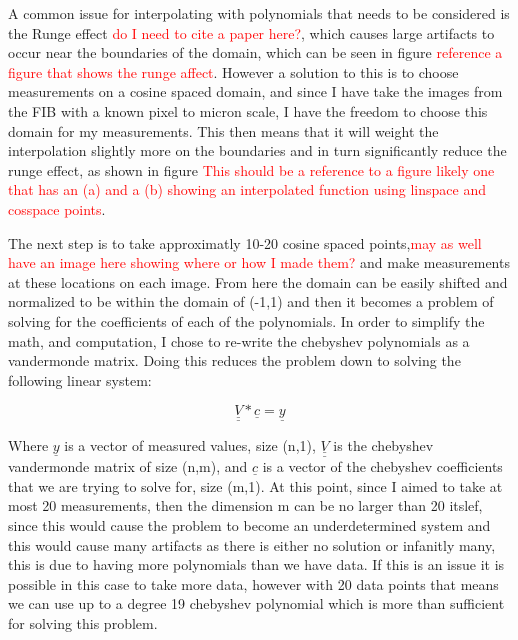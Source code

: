 \documentclass[review]{elsarticle}
\def\doubleunderline#1{\underline{\underline{#1}}}
\begin{document}
		A common issue for interpolating with polynomials that needs to be considered is the Runge effect \textcolor{red}{do I need to cite a paper here?}, which causes large artifacts to occur near the boundaries
		of the domain, which can be seen in figure \textcolor{red}{reference a figure that shows the runge affect}. However a solution to this is to choose measurements on a cosine spaced domain, and since I have 
		take the images from the FIB with a known pixel to micron scale, I have the freedom to choose this domain for my measurements. This then means that it will weight the interpolation slightly more on the boundaries
		and in turn significantly reduce the runge effect, as shown in figure \textcolor{red}{This should be a reference to a figure likely one that has an (a) and a (b) showing an interpolated function using linspace
		and cosspace points}.

		The next step is to take approximatly 10-20 cosine spaced points,\textcolor{red}{may as well have an image here showing where or how I made them?} and make measurements at these locations on each image. 
		From here the domain can be easily shifted and normalized to be within the domain of (-1,1) and then it becomes a problem of solving for the coefficients of each of the polynomials. In order to simplify
		the math, and computation, I chose to re-write the chebyshev polynomials as a vandermonde matrix. Doing this reduces the problem down to solving the following linear system:

		\begin{equation}
		    \doubleunderline{V}*\underline{c} = \underline{y}
			\label{eq:Linear_system}
		\end{equation}

		Where $\underline{y}$ is a vector of measured values, size (n,1), $\doubleunderline{V}$ is the chebyshev vandermonde matrix of size (n,m), and $\underline{c}$ is a vector of the chebyshev coefficients that
		we are trying to solve for, size (m,1). At this point, since I aimed to take at most 20 measurements, then the dimension m can be no larger than 20 itslef, since this would cause the problem to become an 
		underdetermined system and this would cause many artifacts as there is either no solution or infanitly many, this is due to having more polynomials than we have data. If this is an issue it is possible
		in this case to take more data, however with 20 data points that means we can use up to a degree 19 chebyshev polynomial which is more than sufficient for solving this problem. 
\end{document}
